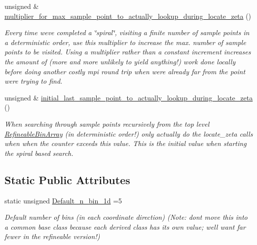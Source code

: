 \begin{DoxyCompactItemize}
$$unsigned \& \hyperlink{classRefineableBinArray_ae5dc08202a4716df1b2138f3dce84e85}{multiplier\+\_\+for\+\_\+max\+\_\+sample\+\_\+point\+\_\+to\+\_\+actually\+\_\+lookup\+\_\+during\+\_\+locate\+\_\+zeta} ()
\begin{DoxyCompactList}\small\item\em Every time we\textquotesingle{}ve completed a \char`\"{}spiral\char`\"{}, visiting a finite number of sample points in a deterministic order, use this multiplier to increase the max. number of sample points to be visited. Using a multiplier rather than a constant increment increases the amount of (more and more unlikely to yield anything!) work done locally before doing another costly mpi round trip when we\textquotesingle{}re already far from the point we\textquotesingle{}re trying to find. \end{DoxyCompactList}\item 
unsigned \& \hyperlink{classRefineableBinArray_a517b1704286e6ee44b771af5348a6854}{initial\+\_\+last\+\_\+sample\+\_\+point\+\_\+to\+\_\+actually\+\_\+lookup\+\_\+during\+\_\+locate\+\_\+zeta} ()
\begin{DoxyCompactList}\small\item\em When searching through sample points recursively from the top level \hyperlink{classRefineableBinArray}{Refineable\+Bin\+Array} (in deterministic order!) only actually do the locate\+\_\+zeta calls when when the counter exceeds this value. This is the initial value when starting the spiral based search. \end{DoxyCompactList}\end{DoxyCompactItemize}
\subsection*{Static Public Attributes}
\begin{DoxyCompactItemize}
\item 
static unsigned \hyperlink{classRefineableBinArray_a34a623036985925b9adc0b28c89ad1c2}{Default\+\_\+n\+\_\+bin\+\_\+1d} =5
\begin{DoxyCompactList}\small\item\em Default number of bins (in each coordinate direction) (Note\+: don\textquotesingle{}t move this into a common base class because each derived class has its own value; we\textquotesingle{}ll want far fewer in the refineable version!) \end{DoxyCompactList}\end{DoxyCompactItemize}
